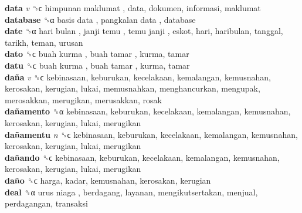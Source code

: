 \textbf{data} \emph{v}  ␝ϲ   himpunan maklumat , data, dokumen, informasi, maklumat  \\
\textbf{database} ␝α   basis data ,  pangkalan data , database  \\
\textbf{date} ␝α   hari bulan ,  janji temu ,  temu janji , eskot, hari, haribulan, tanggal, tarikh, teman, urusan  \\
\textbf{dato} ␝ϲ   buah kurma ,  buah tamar , kurma, tamar  \\
\textbf{datu} ␝ϲ   buah kurma ,  buah tamar , kurma, tamar  \\
\textbf{daña} \emph{v}  ␝ϲ  kebinasaan, keburukan, kecelakaan, kemalangan, kemusnahan, kerosakan, kerugian, lukai, memusnahkan, menghancurkan, mengupak, merosakkan, merugikan, merusakkan, rosak  \\
\textbf{dañamento} ␝α  kebinasaan, keburukan, kecelakaan, kemalangan, kemusnahan, kerosakan, kerugian, lukai, merugikan  \\
\textbf{dañamentu} \emph{n}  ␝ϲ  kebinasaan, keburukan, kecelakaan, kemalangan, kemusnahan, kerosakan, kerugian, lukai, merugikan  \\
\textbf{dañando} ␝ϲ  kebinasaan, keburukan, kecelakaan, kemalangan, kemusnahan, kerosakan, kerugian, lukai, merugikan  \\
\textbf{daño} ␝ϲ  harga, kadar, kemusnahan, kerosakan, kerugian  \\
\textbf{deal} ␝α   urus niaga , berdagang, layanan, mengikutsertakan, menjual, perdagangan, transaksi  \\
